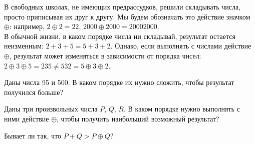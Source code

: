 ﻿
\noindent В свободных школах, не имеющих предрассудков, решили складывать числа, просто приписывая их друг к другу. Мы будем обозначать это действие значком $\oplus$: например, $2 \oplus 2 = 22$, $2000 \oplus 2000 = 20002000$. \smallskip\\
В обычной жизни, в каком порядке числа ни складывай, результат остается неизменным: $2+3+5 = 5+3+2$. Однако, если выполнять с числами действие $\oplus$, результат может изменяться в зависимости от порядка чисел: $2 \oplus 3 \oplus 5 = 235 \ne 532 = 5 \oplus 3 \oplus 2$.

\begin{enumerate}
\itA Даны числа 95 и 500. В каком порядке их нужно сложить, чтобы результат получился больше?

\itB Даны три произвольных числа $P$, $Q$, $R$. В каком порядке нужно выполнять с ними действие $\oplus$, чтобы получить наибольший возможный результат?

\itC Бывает ли так, что $P + Q > P \oplus Q$?
\end{enumerate}